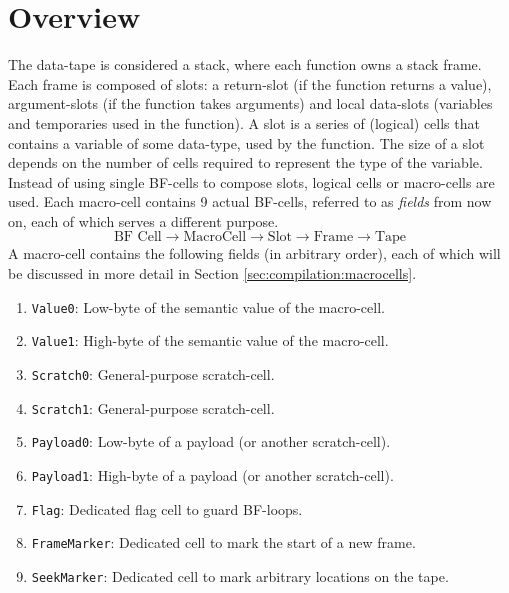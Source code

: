 \section{Overview}
\label{sec:compilation:tapeoverview}
The data-tape is considered a stack, where each function owns a stack frame. Each frame is composed of slots: a return-slot (if the function returns a value), argument-slots (if the function takes arguments) and local data-slots (variables and temporaries used in the function). A slot is a series of (logical) cells that contains a variable of some data-type, used by the function. The size of a slot depends on the number of cells required to represent the type of the variable. Instead of using single BF-cells to compose slots, logical cells or macro-cells are used. Each macro-cell contains 9 actual BF-cells, referred to as \emph{fields} from now on, each of which serves a different purpose.
\[
\text{BF Cell}
\longrightarrow
\text{MacroCell}
\longrightarrow
\text{Slot}
\longrightarrow
\text{Frame}
\longrightarrow
\text{Tape}
\]
A macro-cell contains the following fields (in arbitrary order), each of which will be discussed in more detail in Section \ref{sec:compilation:macrocells}.
\begin{enumerate}\itemsep0em 
\item \texttt{Value0}: Low-byte of the semantic value of the macro-cell.
\item \texttt{Value1}: High-byte of the semantic value of the macro-cell.
\item \texttt{Scratch0}: General-purpose scratch-cell.
\item \texttt{Scratch1}: General-purpose scratch-cell.
\item \texttt{Payload0}: Low-byte of a payload (or another scratch-cell).
\item \texttt{Payload1}: High-byte of a payload (or another scratch-cell).  
\item \texttt{Flag}: Dedicated flag cell to guard BF-loops.
\item \texttt{FrameMarker}: Dedicated cell to mark the start of a new frame.
\item \texttt{SeekMarker}: Dedicated cell to mark arbitrary locations on the tape.
\end{enumerate}


